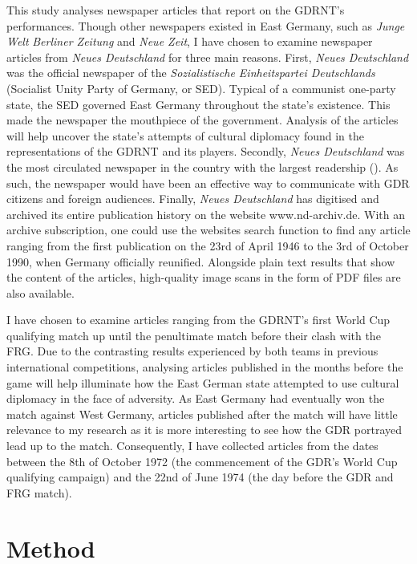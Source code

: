 This study analyses newspaper articles that report on the GDRNT’s performances. Though other newspapers existed in East Germany, such as \textit{Junge Welt} \textit{Berliner Zeitung} and \textit{Neue Zeit}, I have chosen to examine newspaper articles from \textit{Neues Deutschland} for three main reasons. First, \textit{Neues Deutschland} was the official newspaper of the \textit{Sozialistische Einheitspartei Deutschlands} (Socialist Unity Party of Germany, or SED). Typical of a communist one-party state, the SED governed East Germany throughout the state’s existence. This made the newspaper the mouthpiece of the government. Analysis of the articles will help uncover the state’s attempts of cultural diplomacy found in the representations of the GDRNT and its players. Secondly, \textit{Neues Deutschland} was the most circulated newspaper in the country with the largest readership (\cite{meyenschweiger2008}). As such, the newspaper would have been an effective way to communicate with GDR citizens and foreign audiences. Finally, \textit{Neues Deutschland} has digitised and archived its entire publication history on the website www.nd-archiv.de. With an archive subscription, one could use the websites search function to find any article ranging from the first publication on the 23rd of April 1946 to the 3rd of October 1990, when Germany officially reunified. Alongside plain text results that show the content of the articles, high-quality image scans in the form of PDF files are also available.

I have chosen to examine articles ranging from the GDRNT’s first World Cup qualifying match up until the penultimate match before their clash with the FRG. Due to the contrasting results experienced by both teams in previous international competitions, analysing articles published in the months before the game will help illuminate how the East German state attempted to use cultural diplomacy in the face of adversity. As East Germany had eventually won the match against West Germany, articles published after the match will have little relevance to my research as it is more interesting to see how the GDR portrayed lead up to the match. Consequently, I have collected articles from the dates between the 8th of October 1972  (the commencement of the GDR’s World Cup qualifying campaign) and the 22nd of June 1974 (the day before the GDR and FRG match).

\section*{Method}

